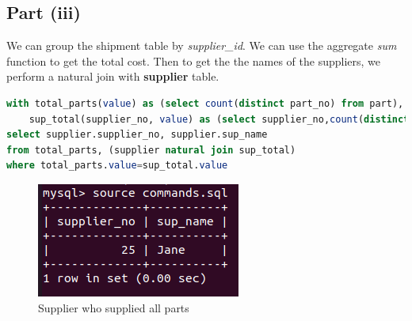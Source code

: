 \documentclass{article}
\begin{document}
\subsection{Part (iii)}
We can group the shipment table by \textit{supplier\_id}. We can use the
aggregate \textit{sum} function to get the total cost. Then to get the
the names of the suppliers, we perform a natural join with \textbf{supplier} table.
\begin{lstlisting}[language=sql]
with total_parts(value) as (select count(distinct part_no) from part), 
    sup_total(supplier_no, value) as (select supplier_no,count(distinct part_no) from shipment group by supplier_no)
select supplier.supplier_no, supplier.sup_name
from total_parts, (supplier natural join sup_total)
where total_parts.value=sup_total.value
\end{lstlisting}
\begin{figure}[!ht]
  \begin{center}
  \includegraphics[scale=1]{5c.png}
  \caption{Supplier who supplied all parts}
  \end{center}
\end{figure}
\end{document}

